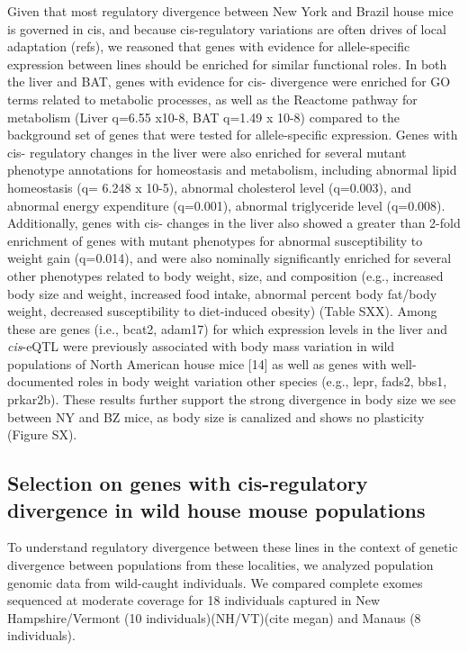 \documentclass[9pt,twocolumn,twoside,lineno]{pnas-new}
\begin{document}
Given that most regulatory divergence between New York and Brazil house
mice is governed in cis, and because cis-regulatory variations are often
drives of local adaptation (refs), we reasoned that genes with evidence
for allele-specific expression between lines should be enriched for
similar functional roles. In both the liver and BAT, genes with evidence
for cis- divergence were enriched for GO terms related to metabolic
processes, as well as the Reactome pathway for metabolism (Liver q=6.55
x10-8, BAT q=1.49 x 10-8) compared to the background set of genes that
were tested for allele-specific expression. Genes with cis- regulatory
changes in the liver were also enriched for several mutant phenotype
annotations for homeostasis and metabolism, including abnormal lipid
homeostasis (q= 6.248 x 10-5), abnormal cholesterol level (q=0.003), and
abnormal energy expenditure (q=0.001), abnormal triglyceride level
(q=0.008). Additionally, genes with cis- changes in the liver also
showed a greater than 2-fold enrichment of genes with mutant phenotypes
for abnormal susceptibility to weight gain (q=0.014), and were also
nominally significantly enriched for several other phenotypes related to
body weight, size, and composition (e.g., increased body size and
weight, increased food intake, abnormal percent body fat/body weight,
decreased susceptibility to diet-induced obesity) (Table SXX). Among
these are genes (i.e., bcat2, adam17) for which expression levels in the
liver and \emph{cis}-eQTL were previously associated with body mass
variation in wild populations of North American house mice {[}14{]} as
well as genes with well-documented roles in body weight variation other
species (e.g., lepr, fads2, bbs1, prkar2b). These results further
support the strong divergence in body size we see between NY and BZ
mice, as body size is canalized and shows no plasticity (Figure SX).

\hypertarget{selection-on-genes-with-cis-regulatory-divergence-in-wild-house-mouse-populations}{%
\subsection*{Selection on genes with cis-regulatory divergence in wild
house mouse
populations}\label{selection-on-genes-with-cis-regulatory-divergence-in-wild-house-mouse-populations}}

To understand regulatory divergence between these lines in the context
of genetic divergence between populations from these localities, we
analyzed population genomic data from wild-caught individuals. We
compared complete exomes sequenced at moderate coverage for 18
individuals captured in New Hampshire/Vermont (10
individuals)(NH/VT)(cite megan) and Manaus (8 individuals).
\end{document}
